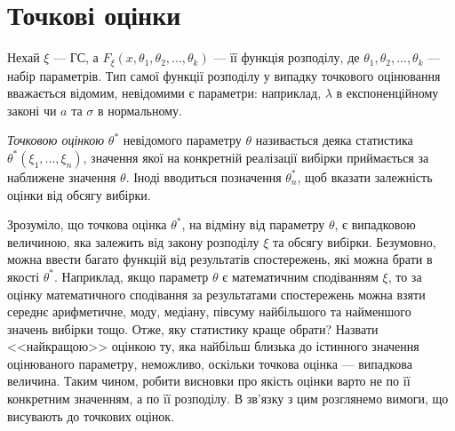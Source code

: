 \section{Точкові оцінки}
Нехай $\xi$ --- ГС, а $F_{\xi}(x, \theta_1, \theta_2, ..., \theta_k)$ --- її функція розподілу, де
$\theta_1, \theta_2, ..., \theta_k$ --- набір параметрів. Тип самої функції розподілу у випадку точкового оцінювання
вважається відомим, невідомими є параметри: наприклад, $\lambda$ в експоненційному законі чи $a$ та $\sigma$ в нормальному.
\begin{definition}
    \emph{Точковою оцінкою} $\theta^*$ невідомого параметру $\theta$ називається деяка статистика
    $\theta^*(\xi_1, ..., \xi_n)$, значення якої на конкретній
    реалізації вибірки приймається за наближене значення $\theta$. Іноді вводиться позначення $\theta^*_n$,
    щоб вказати залежність оцінки від обсягу вибірки.
\end{definition}
Зрозуміло, що точкова оцінка $\theta^*$, на відміну від параметру $\theta$, є випадковою величиною, 
яка залежить від закону розподілу $\xi$ та обсягу вибірки. Безумовно, можна ввести багато функцій від результатів спостережень, 
які можна брати в якості $\theta^*$. Наприклад, якщо параметр $\theta$ є математичним сподіванням $\xi$, 
то за оцінку математичного сподівання за результатами спостережень можна взяти середнє арифметичне, моду, медіану, 
півсуму найбільшого та найменшого значень вибірки тощо. 
Отже, яку статистику краще обрати? Назвати <<найкращою>> оцінкою ту, яка найбільш близька до істинного значення оцінюваного параметру, 
неможливо, оскільки точкова оцінка --- випадкова величина. Таким чином, робити висновки про якість оцінки варто не по її конкретним значенням, 
а по її розподілу. В зв'язку з цим розглянемо вимоги, що висувають до точкових оцінок.

